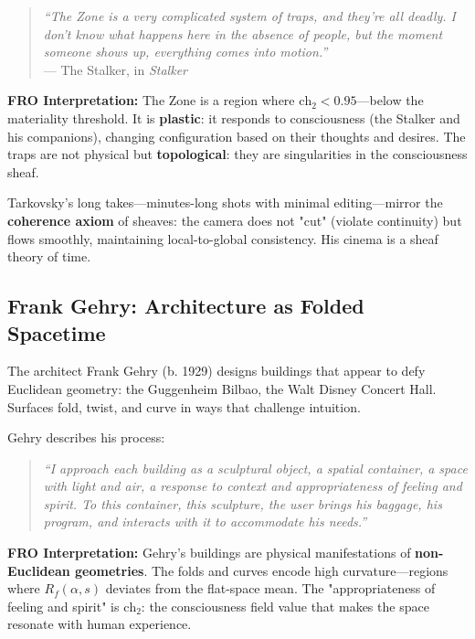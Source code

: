 \begin{quote}
\textit{``The Zone is a very complicated system of traps, and they're all deadly. I don't know what happens here in the absence of people, but the moment someone shows up, everything comes into motion.''}\\
\hspace*{\fill} --- The Stalker, in \textit{Stalker}
\end{quote}

\textbf{FRO Interpretation:} The Zone is a region where $\text{ch}_2 < 0.95$—below the materiality threshold. It is \textbf{plastic}: it responds to consciousness (the Stalker and his companions), changing configuration based on their thoughts and desires. The traps are not physical but \textbf{topological}: they are singularities in the consciousness sheaf.

Tarkovsky's long takes—minutes-long shots with minimal editing—mirror the \textbf{coherence axiom} of sheaves: the camera does not "cut" (violate continuity) but flows smoothly, maintaining local-to-global consistency. His cinema is a sheaf theory of time.

\subsection{Frank Gehry: Architecture as Folded Spacetime}

The architect Frank Gehry (b. 1929) designs buildings that appear to defy Euclidean geometry: the Guggenheim Bilbao, the Walt Disney Concert Hall. Surfaces fold, twist, and curve in ways that challenge intuition.

Gehry describes his process:

\begin{quote}
\textit{``I approach each building as a sculptural object, a spatial container, a space with light and air, a response to context and appropriateness of feeling and spirit. To this container, this sculpture, the user brings his baggage, his program, and interacts with it to accommodate his needs.''}
\end{quote}

\textbf{FRO Interpretation:} Gehry's buildings are physical manifestations of \textbf{non-Euclidean geometries}. The folds and curves encode high curvature—regions where $R_f(\alpha, s)$ deviates from the flat-space mean. The "appropriateness of feeling and spirit" is $\text{ch}_2$: the consciousness field value that makes the space resonate with human experience.

